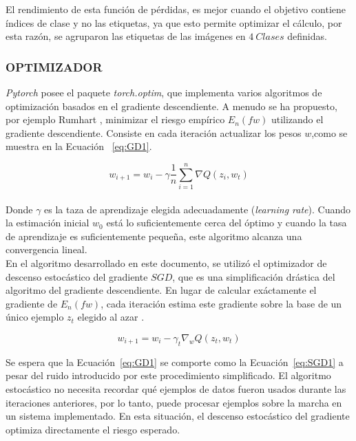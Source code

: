 El rendimiento de esta función de pérdidas, es mejor cuando el objetivo contiene índices de clase y no las etiquetas, ya que esto permite optimizar el cálculo, por esta razón, se agruparon las etiquetas de las imágenes en $4 \ Clases$ definidas.

\subsubsection{OPTIMIZADOR}

\textit{Pytorch} posee el paquete \textit{torch.optim}, que implementa varios algoritmos de optimización basados en el gradiente descendiente. A menudo se ha propuesto, por ejemplo Rumhart \cite{rumelhart1986learning}, minimizar el riesgo empírico $E_n(fw)$ utilizando el gradiente descendiente. Consiste en cada iteración actualizar los pesos $w$,como se muestra en la Ecuación ~\ref{eq:GD1}.


\begin{equation}
	\label{eq:GD1}
	{w_{i+1}=w_i-\gamma\frac{1}{n}\sum_{i=1}^{n}\nabla Q(z_i,w_t)}
\end{equation}\\

Donde $\gamma$ es la taza de aprendizaje elegida adecuadamente (\textit{learning rate}). Cuando la estimación inicial $w_0$ está lo suficientemente cerca del óptimo y cuando la tasa de aprendizaje es suficientemente pequeña, este algoritmo alcanza una convergencia lineal.\\


En el algoritmo desarrollado en este documento, se utilizó el optimizador de descenso estocástico del gradiente $SGD$, que es una simplificación drástica del algoritmo del gradiente descendiente. En lugar de calcular exáctamente el gradiente de $E_n(fw)$, cada iteración estima este gradiente sobre la base de un único ejemplo $z_t$ elegido al azar \cite{bottou2012stochastic}.

\begin{equation}
	\label{eq:SGD1}
	{w_{i+1}=w_i-\gamma_t\nabla_w Q(z_t,w_t)}
\end{equation}

Se espera que la Ecuación~\ref{eq:GD1} se comporte como la Ecuación~\ref{eq:SGD1} a pesar del ruido introducido por este procedimiento simplificado. El algoritmo estocástico no necesita recordar qué ejemplos de datos fueron usados durante las iteraciones anteriores, por lo tanto, puede procesar ejemplos sobre la marcha en un sistema implementado. En esta situación, el descenso estocástico del gradiente optimiza directamente el riesgo esperado.	

